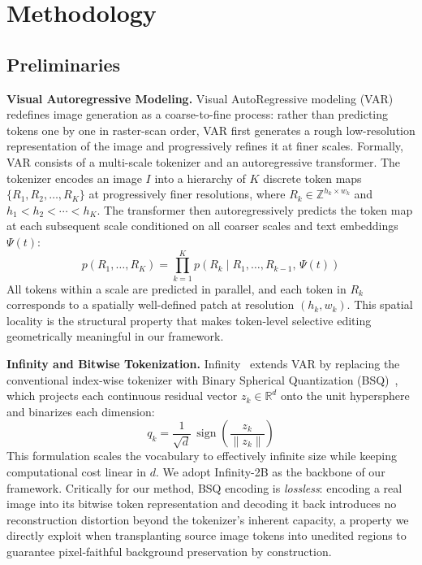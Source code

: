 
\section{Methodology}
\label{section:method}

\subsection{Preliminaries}
\label{sec:preliminaries}

\noindent\textbf{Visual Autoregressive Modeling.}
Visual AutoRegressive modeling (VAR)~\cite{VAR} redefines image generation as a 
coarse-to-fine process: rather than predicting tokens one by one in raster-scan 
order, VAR first generates a rough low-resolution representation of the image and 
progressively refines it at finer scales. Formally, VAR consists of a multi-scale tokenizer and 
an autoregressive transformer. The tokenizer encodes an image $I$ into a hierarchy 
of $K$ discrete token maps $\{R_1, R_2, \ldots, R_K\}$ at progressively finer 
resolutions, where $R_k \in \mathbb{Z}^{h_k \times w_k}$ and 
$h_1 < h_2 < \cdots < h_K$. The transformer then autoregressively predicts the 
token map at each subsequent scale conditioned on all coarser scales and text 
embeddings $\Psi(t)$:
\begin{equation}
    p(R_1, \ldots, R_K) = \prod_{k=1}^{K} p\!\left(R_k \mid R_1, \ldots, 
    R_{k-1},\, \Psi(t)\right)
\end{equation}
All tokens within a scale are predicted in parallel, and each token in $R_k$ 
corresponds to a spatially well-defined patch at resolution $(h_k, w_k)$. This 
spatial locality is the structural property that makes token-level selective 
editing geometrically meaningful in our framework.

\noindent\textbf{Infinity and Bitwise Tokenization.}
Infinity~\cite{Infinity} extends VAR by replacing the conventional index-wise 
tokenizer with Binary Spherical Quantization (BSQ)~\cite{BSQVAE}, which projects 
each continuous residual vector $z_k \in \mathbb{R}^d$ onto the unit hypersphere 
and binarizes each dimension:
\begin{equation}
    q_k = \frac{1}{\sqrt{d}}\,\operatorname{sign}\!\left(\frac{z_k}{\|z_k\|}
    \right)
\end{equation}
This formulation scales the vocabulary to effectively infinite size while keeping 
computational cost linear in $d$. We adopt Infinity-2B as the backbone of our 
framework. Critically for our method, BSQ encoding is \textit{lossless}: encoding 
a real image into its bitwise token representation and decoding it back introduces 
no reconstruction distortion beyond the tokenizer's inherent capacity, a property 
we directly exploit when transplanting source image tokens into unedited regions 
to guarantee pixel-faithful background preservation by construction.


